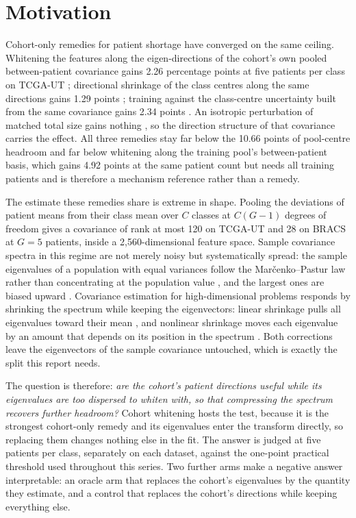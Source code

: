 \documentclass[11pt]{article}
\begin{document}
\section{Motivation}
\label{sec:motivation}
Cohort-only remedies for patient shortage have converged on the same ceiling. Whitening the features along the eigen-directions of the cohort's own pooled between-patient covariance gains 2.26 percentage points at five patients per class on TCGA-UT \citep{queisler2026patientDirections}; directional shrinkage of the class centres along the same directions gains 1.29 points \citep{queisler2026directionalShrinkage}; training against the class-centre uncertainty built from the same covariance gains 2.34 points \citep{queisler2026centreUncertainty}. An isotropic perturbation of matched total size gains nothing \citep{queisler2026centreUncertainty}, so the direction structure of that covariance carries the effect. All three remedies stay far below the 10.66 points of pool-centre headroom \citep{queisler2026centreError} and far below whitening along the training pool's between-patient basis, which gains 4.92 points at the same patient count but needs all training patients and is therefore a mechanism reference rather than a remedy.

The estimate these remedies share is extreme in shape. Pooling the deviations of patient means from their class mean over $C$ classes at $C(G-1)$ degrees of freedom gives a covariance of rank at most 120 on TCGA-UT and 28 on BRACS at $G=5$ patients, inside a 2,560-dimensional feature space. Sample covariance spectra in this regime are not merely noisy but systematically spread: the sample eigenvalues of a population with equal variances follow the Mar\v{c}enko--Pastur law rather than concentrating at the population value \citep{marchenko1967}, and the largest ones are biased upward \citep{johnstone2001}. Covariance estimation for high-dimensional problems responds by shrinking the spectrum while keeping the eigenvectors: linear shrinkage pulls all eigenvalues toward their mean \citep{ledoit2004wellconditioned}, and nonlinear shrinkage moves each eigenvalue by an amount that depends on its position in the spectrum \citep{ledoit2020analytical}. Both corrections leave the eigenvectors of the sample covariance untouched, which is exactly the split this report needs.

The question is therefore: \emph{are the cohort's patient directions useful while its eigenvalues are too dispersed to whiten with, so that compressing the spectrum recovers further headroom?} Cohort whitening hosts the test, because it is the strongest cohort-only remedy and its eigenvalues enter the transform directly, so replacing them changes nothing else in the fit. The answer is judged at five patients per class, separately on each dataset, against the one-point practical threshold used throughout this series. Two further arms make a negative answer interpretable: an oracle arm that replaces the cohort's eigenvalues by the quantity they estimate, and a control that replaces the cohort's directions while keeping everything else.
\end{document}

